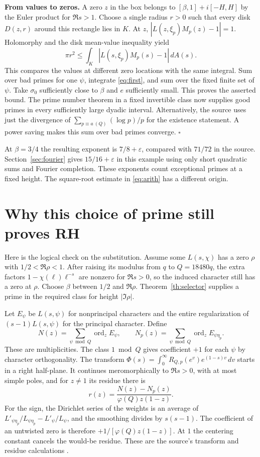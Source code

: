 \documentclass[11pt,letterpaper]{article}
\newcommand{\sg}{\sigma_0}
\newcommand{\e}{\varepsilon}
\begin{document}
\textbf{From values to zeros.} A zero $z$ in the box belongs to $[\beta,1]+i[-H,H]$ by the Euler product for $\Re s>1$. Choose a single radius $r>0$ such that every disk $D(z,r)$ around this rectangle lies in $K$. At $z$, $|L(z,\xi_p)M_p(z)-1|=1$. Holomorphy and the disk mean-value inequality yield
\[
 \pi r^2\le\int_K |L(s,\xi_p)M_p(s)-1|\,dA(s).
\]
This compares the values at different zero locations with the same integral. Sum over bad primes for one $\psi$, integrate \eqref{eq:first}, and sum over the fixed finite set of $\psi$. Take $\sg$ sufficiently close to $\beta$ and $e$ sufficiently small. This proves the asserted bound. The prime number theorem in a fixed invertible class now supplies good primes in every sufficiently large dyadic interval. Alternatively, the source uses just the divergence of $\sum_{p\equiv a\ (Q)}(\log p)/p$ for the existence statement. A power saving makes this sum over bad primes converge. \hfill$\square$

At $\beta=3/4$ the resulting exponent is $7/8+\e$, compared with $71/72$ in the source. Section~\ref{sec:fourier} gives $15/16+\e$ in this example using only short quadratic sums and Fourier completion. These exponents count exceptional primes at a fixed height. The square-root estimate in \eqref{eq:arith} has a different origin.
\clearpage
\section{Why this choice of prime still proves RH}\label{sec:endgame}
Here is the logical check on the substitution. Assume some $L(s,\chi)$ has a zero $\rho$ with $1/2<\Re\rho<1$. After raising its modulus from $q$ to $Q=18480q$, the extra factors $1-\chi(\ell)\ell^{-s}$ are nonzero for $\Re s>0$, so the induced character still has a zero at $\rho$. Choose $\beta$ between $1/2$ and $\Re\rho$. Theorem~\ref{th:selector} supplies a prime in the required class for height $|\Im\rho|$.

Let $E_\psi$ be $L(s,\psi)$ for nonprincipal characters and the entire regularization of $(s-1)L(s,\psi)$ for the principal character. Define
\[
 N(z)=\sum_{\psi\bmod Q}\operatorname{ord}_z E_\psi,\qquad
 N_p(z)=\sum_{\psi\bmod Q}\operatorname{ord}_z E_{\psi\eta_p}.
\]
These are multiplicities. The class $1\bmod Q$ gives coefficient $+1$ for each $\psi$ by character orthogonality. The transform $\Phi(s)=\int_0^\infty R_{Q,p}(e^v)e^{(1-s)v}\,dv$ starts in a right half-plane. It continues meromorphically to $\Re s>0$, with at most simple poles, and for $z\ne 1$ its residue there is
\begin{equation}
 r(z)=\frac{N(z)-N_p(z)}{\varphi(Q)z(1-z)}.\label{eq:res}
\end{equation}
For the sign, the Dirichlet series of the weights is an average of
$L'_{\psi\eta_p}/L_{\psi\eta_p}-L'_\psi/L_\psi$, and the smoothing divides by $s(s-1)$. The coefficient of an untwisted zero is therefore $+1/[\varphi(Q)z(1-z)]$. At $1$ the centering constant cancels the would-be residue. These are the source's transform and residue calculations \cite{primeerror}.
\end{document}

